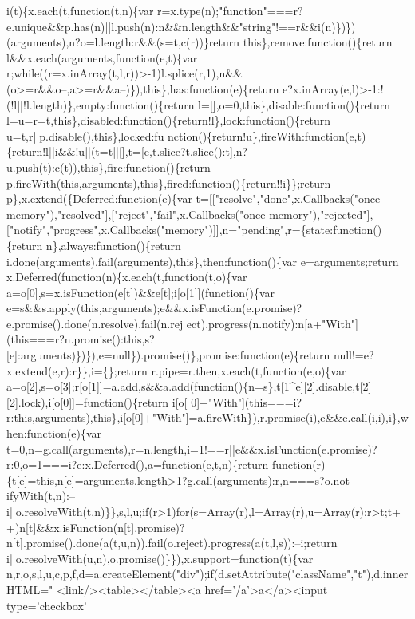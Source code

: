 \begin{DoxyCode}
{       i(t)\{x.each(t,function(t,n)\{var
       r=x.type(n);"function"===r?e.unique&&p.has(n)||l.push(n):n&&n.length&&"string"!==r&&i(n)\})\})(arguments),n?o=l.length:r&&(s=t,c(r))\}return this\},remove:function()\{return
       l&&x.each(arguments,function(e,t)\{var
       r;while((r=x.inArray(t,l,r))>-1)l.splice(r,1),n&&(o>=r&&o--,a>=r&&a--)\}),this\},has:function(e)\{return e?x.inArray(e,l)>-1:!(!l||!l.length)\},empty:function()\{return
       l=[],o=0,this\},disable:function()\{return l=u=r=t,this\},disabled:function()\{return!l\},lock:function()\{return
       u=t,r||p.disable(),this\},locked:fu
      nction()\{return!u\},fireWith:function(e,t)\{return!l||i&&!u||(t=t||[],t=[e,t.slice?t.slice():t],n?u.push(t):c(t)),this\},fire:function()\{return p.fireWith(this,arguments),this\},fired:function()\{return!!i\}\};return
       p\},x.extend(\{Deferred:function(e)\{var t=[["resolve","done",x.Callbacks("once
       memory"),"resolved"],["reject","fail",x.Callbacks("once
       memory"),"rejected"],["notify","progress",x.Callbacks("memory")]],n="pending",r=\{state:function()\{return n\},always:function()\{return i.done(arguments).fail(arguments),this\},then:function()\{var
       e=arguments;return x.Deferred(function(n)\{x.each(t,function(t,o)\{var
       a=o[0],s=x.isFunction(e[t])&&e[t];i[o[1]](function()\{var
       e=s&&s.apply(this,arguments);e&&x.isFunction(e.promise)?e.promise().done(n.resolve).fail(n.rej
      ect).progress(n.notify):n[a+"With"](this===r?n.promise():this,s?[e]:arguments)\})\}),e=null\}).promise()\},promise:function(e)\{return null!=e?x.extend(e,r):r\}\},i=\{\};return r.pipe=r.then,x.each(t,function(e,o)\{var
       a=o[2],s=o[3];r[o[1]]=a.add,s&&a.add(function()\{n=s\},t[1^e][2].disable,t[2][2].lock),i[o[0]]=function()\{return
       i[o[
      0]+"With"](this===i?r:this,arguments),this\},i[o[0]+"With"]=a.fireWith\}),r.promise(i),e&&e.call(i,i),i\},when:function(e)\{var
       t=0,n=g.call(arguments),r=n.length,i=1!==r||e&&x.isFunction(e.promise)?r:0,o=1===i?e:x.Deferred(),a=function(e,t,n)\{return
       function(r)\{t[e]=this,n[e]=arguments.length>1?g.call(arguments):r,n===s?o.not
      ifyWith(t,n):--i||o.resolveWith(t,n)\}\},s,l,u;if(r>1)for(s=Array(r),l=Array(r),u=Array(r);r>t;t++)n[t]&&x.isFunction(n[t].promise)?n[t].promise().done(a(t,u,n)).fail(o.reject).progress(a(t,l,s)):--i;return
       i||o.resolveWith(u,n),o.promise()\}\}),x.support=function(t)\{var
       n,r,o,s,l,u,c,p,f,d=a.createElement("div");if(d.setAttribute("className","t"),d.innerHTML="  <link/><table></table><a href='}/a\textcolor{stringliteral}{'>a</a><input type='}checkbox\textcolor{stringliteral}{'
}
\end{DoxyCode}
